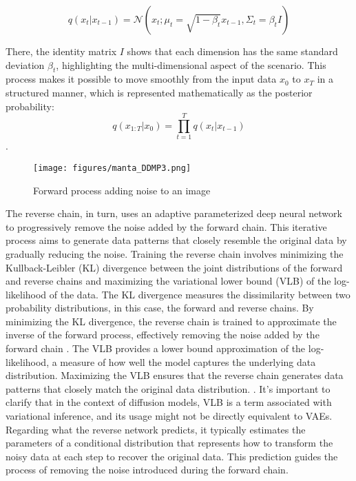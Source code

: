 \[ q(x_t | x_{t-1}) = \mathcal{N}(x_t; \mu_t = \sqrt{1 - \beta_t}x_{t-1}, \Sigma_t = \beta_t I) \] 

There, the identity matrix \( I \) shows that each dimension has the same standard deviation \( \beta_t \), highlighting the multi-dimensional aspect of the scenario. This process makes it possible to move smoothly from the input data \( x_0 \) to \( x_T \) in a structured manner, which is represented mathematically as the posterior probability: \[ q(x_{1:T} | x_0) = \prod_{t=1}^T q(x_t | x_{t-1}) \].

\begin{figure}[ht]
\centering
  \texttt{[image: figures/manta\_DDMP3.png]}
  \caption{Forward process adding noise to an image}
  \label{fig:figureDDPM}
\end{figure}

The reverse chain, in turn, uses an adaptive parameterized deep neural network to progressively remove the noise added by the forward chain. This iterative process aims to generate data patterns that closely resemble the original data by gradually reducing the noise. Training the reverse chain involves minimizing the Kullback-Leibler (KL) divergence between the joint distributions of the forward and reverse chains and maximizing the variational lower bound (VLB) of the log-likelihood of the data. The KL divergence measures the dissimilarity between two probability distributions, in this case, the forward and reverse chains. By minimizing the KL divergence, the reverse chain is trained to approximate the inverse of the forward process, effectively removing the noise added by the forward chain \citep{sohlDDPM}. The VLB provides a lower bound approximation of the log-likelihood, a measure of how well the model captures the underlying data distribution. Maximizing the VLB ensures that the reverse chain generates data patterns that closely match the original data distribution. \citep{hoDDPMs, sohlDDPM}. It's important to clarify that in the context of diffusion models, VLB is a term associated with variational inference, and its usage might not be directly equivalent to VAEs. Regarding what the reverse network predicts, it typically estimates the parameters of a conditional distribution that represents how to transform the noisy data at each step to recover the original data. This prediction guides the process of removing the noise introduced during the forward chain.

